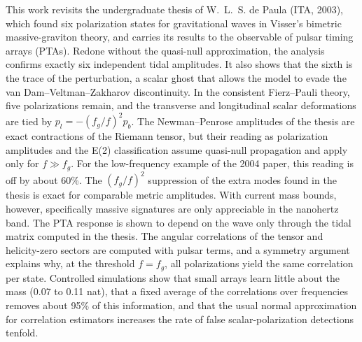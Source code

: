 This work revisits the undergraduate thesis of W.~L.~S. de Paula (ITA,
2003), which found six polarization states for gravitational waves in
Visser's bimetric massive-graviton theory, and carries its results to
the observable of pulsar timing arrays (PTAs). Redone without the
quasi-null approximation, the analysis confirms exactly six independent
tidal amplitudes. It also shows that the sixth is the trace of the
perturbation, a scalar ghost that allows the model to evade the van
Dam--Veltman--Zakharov discontinuity. In the consistent Fierz--Pauli
theory, five polarizations remain, and the transverse and longitudinal
scalar deformations are tied by $p_l=-(f_g/f)^2p_b$. The Newman--Penrose
amplitudes of the thesis are exact contractions of the Riemann tensor,
but their reading as polarization amplitudes and the E(2)
classification assume quasi-null propagation and apply only for
$f\gg f_g$. For the low-frequency example of the 2004 paper, this
reading is off by about 60\%.
The $(f_g/f)^2$ suppression of the extra modes found in the thesis is
exact for comparable metric amplitudes. With current mass bounds,
however, specifically massive signatures are only appreciable in the
nanohertz band. The PTA response is shown to depend on the wave only
through the tidal matrix computed in the thesis. The angular
correlations of the tensor and helicity-zero sectors are computed with
pulsar terms, and a symmetry argument explains why, at the threshold
$f=f_g$, all polarizations yield the same correlation per state.
Controlled simulations show that small arrays learn little about the
mass (0.07 to 0.11 nat), that a fixed average of the correlations over frequencies removes
about 95\% of this information, and that the usual normal approximation for
correlation estimators increases the rate of false scalar-polarization
detections tenfold.
